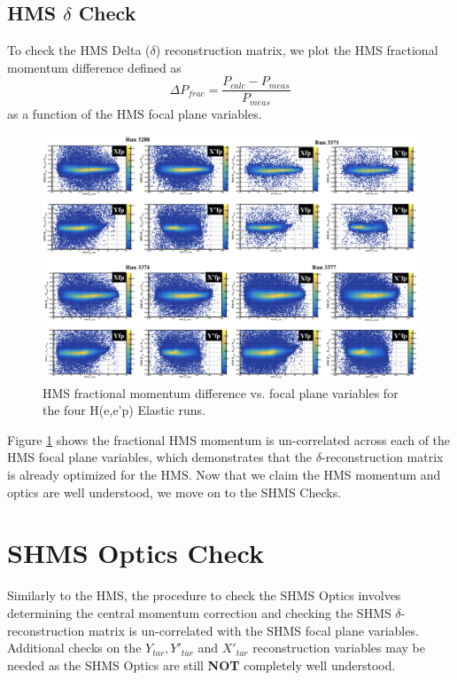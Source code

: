 \documentclass[11pt]{article}
\begin{document}
\subsection{HMS $\delta$ Check }
To check the HMS Delta ($\delta$) reconstruction matrix, we plot the HMS fractional momentum difference defined as
\begin{equation}
\Delta P_{frac} = \frac{P_{calc} - P_{meas}}{P_{meas}}
\end{equation}
as a function of the HMS focal plane variables.  

\begin{figure}[h!]
  \centering
  \includegraphics[scale=0.4]{plots/HMS_hPdiff_vs_FP.png}
  \caption{HMS fractional momentum difference vs. focal plane variables for the four H(e,e'p) Elastic runs.}
  \label{fig:hms_hPdiff_vs_FP}
\end{figure}
\noindent Figure \ref{fig:hms_hPdiff_vs_FP} shows the fractional HMS momentum is un-correlated across each of the
HMS focal plane variables, which demonstrates that the $\delta$-reconstruction matrix is already optimized
for the HMS. Now that we claim the HMS momentum and optics are well understood, we move on to the SHMS Checks.

\section{SHMS Optics Check}
Similarly to the HMS, the procedure to check the SHMS Optics involves determining the central momentum correction
and checking the SHMS $\delta$-reconstruction matrix is un-correlated with the SHMS focal plane variables. Additional
checks on the $Y_{tar}, Y'_{tar}$ and $X'_{tar}$ reconstruction variables may be needed as the SHMS Optics are still \textbf{NOT}
completely well understood.
\end{document}
